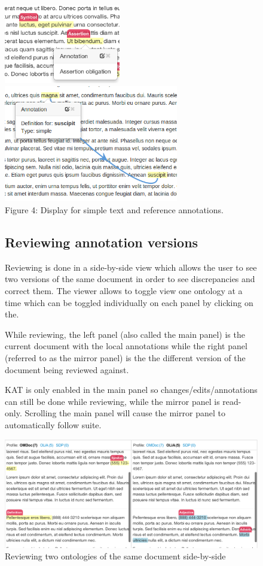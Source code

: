 \documentclass[a4paper, 12pt, notitlepage]{report}
\def\KAT{\textsf{KAT}\xspace}
\begin{document}
\begin{figure}[ht]
\begin{center}
\includegraphics[width=2in]{suscipit.png} \includegraphics[width=3in]{definition.png}\\
\tiny{Figure 4: Display for simple text and reference annotations.}
\end{center}

\subsection{Reviewing annotation versions}
Reviewing is done in a side-by-side view which allows the user to see two versions of the
same document in order to see discrepancies and correct them. The viewer allows to toggle
view one ontology at a time which can be toggled individually on each panel by clicking on
the. 

While reviewing, the left panel (also called the main panel) is the current document with
the local annotations while the right panel (referred to as the mirror panel) is the the
different version of the document being reviewed against.

\KAT is only enabled in the main panel so changes/edits/annotations can still be done
while reviewing, while the mirror panel is read-only. Scrolling the main panel will cause
the mirror panel to automatically follow suite.

\begin{center}
 \includegraphics[width=5in]{review.png}\\
 \tiny{Reviewing two ontologies of the same document side-by-side}
\end{center}



\end{figure}
\end{document}
